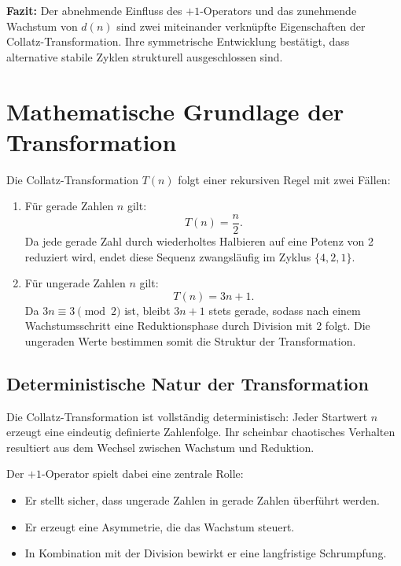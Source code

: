 \documentclass[a4paper,12pt]{article}
\begin{document}
\textbf{Fazit:} Der abnehmende Einfluss des \( +1 \)-Operators und das zunehmende Wachstum von \( d(n) \) sind zwei miteinander verknüpfte Eigenschaften der Collatz-Transformation. Ihre symmetrische Entwicklung bestätigt, dass alternative stabile Zyklen strukturell ausgeschlossen sind.





\section{Mathematische Grundlage der Transformation}

Die Collatz-Transformation \( T(n) \) folgt einer rekursiven Regel mit zwei Fällen:
\begin{enumerate}
    \item Für gerade Zahlen \( n \) gilt:
    \[
    T(n) = \frac{n}{2}.
    \]
    Da jede gerade Zahl durch wiederholtes Halbieren auf eine Potenz von 2 reduziert wird, endet diese Sequenz zwangsläufig im Zyklus \( \{4, 2, 1\} \).
    
    \item Für ungerade Zahlen \( n \) gilt:
    \[
    T(n) = 3n + 1.
    \]
    Da \( 3n \equiv 3 \pmod{2} \) ist, bleibt \( 3n+1 \) stets gerade, sodass nach einem Wachstumsschritt eine Reduktionsphase durch Division mit 2 folgt. Die ungeraden Werte bestimmen somit die Struktur der Transformation.
\end{enumerate}

\subsection{Deterministische Natur der Transformation}

Die Collatz-Transformation ist vollständig deterministisch: Jeder Startwert \( n \) erzeugt eine eindeutig definierte Zahlenfolge. Ihr scheinbar chaotisches Verhalten resultiert aus dem Wechsel zwischen Wachstum und Reduktion.

Der \( +1 \)-Operator spielt dabei eine zentrale Rolle:
\begin{itemize}
    \item Er stellt sicher, dass ungerade Zahlen in gerade Zahlen überführt werden.
    \item Er erzeugt eine Asymmetrie, die das Wachstum steuert.
    \item In Kombination mit der Division bewirkt er eine langfristige Schrumpfung.
\end{itemize}
\end{document}
